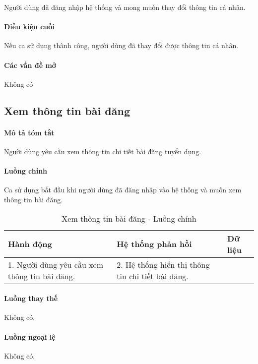 \documentclass[./../main.tex]{subfiles}
\begin{document}
Người dùng đã đăng nhập hệ thống và mong muốn thay đổi thông tin cá
nhân.

\paragraph*{Điều kiện cuối}

Nếu ca sử dụng thành công, người dùng đã thay đổi được thông tin cá
nhân.

\paragraph*{Các vấn đề mở}

Không có

\subsection{Xem thông tin bài đăng}

\paragraph*{Mô tả tóm tắt}

Người dùng yêu cầu xem thông tin chi tiết bài đăng tuyển dụng.

\paragraph*{Luồng chính} Ca sử dụng bắt đầu khi người dùng đã đăng nhập vào
hệ thống và muốn xem thông tin bài đăng.

\begin{table}[H]
	\caption{Xem thông tin bài đăng - Luồng chính}
	\label{tab:read_post}
	\begin{tabularx}{\textwidth}{|X|X|X|}
		\hline
		\textbf{Hành động}                            & \textbf{Hệ thống phản hồi}                        & \textbf{Dữ liệu} \\ \hline
		1. Người dùng yêu cầu xem thông tin bài đăng. & 2. Hệ thống hiển thị thông tin chi tiết bài đăng. &                  \\ \hline
	\end{tabularx}
\end{table}

\paragraph*{Luồng thay thế} Không có.

\paragraph*{Luồng ngoại lệ} Không có.
\end{document}
